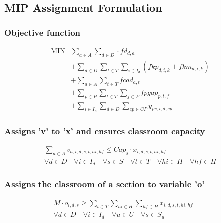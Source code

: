 
\subsection{MIP  Assignment Formulation}


\subsubsection{Objective function}
$$
\begin{array}{rl}
   \mbox{MIN} &
			\sum\limits_{a \in A}\sum\limits_{d \in D} \cdot fd_{d,a}
      \\
      &
       + \sum\limits_{d \in D} 
\sum\limits_{t \in T} \sum\limits_{i \in I_{d}} (fkp_{d,i,k} + fkm_{d,i,k})
      \\
      &
       + \sum\limits_{a \in A} \sum\limits_{t \in T} fcad_{a,t}
      \\
      &      
      + \sum\limits_{p \in P} \sum\limits_{t \in T} \sum\limits_{f \in F} fpgap_{p,t,f}
      \\
      &
      + \sum\limits_{i \in I_{d}} \sum\limits_{d \in D} \sum\limits_{cp \in CP} y_{pv,i,d,cp}
\end{array}
$$




\subsubsection{Assigns 'v' to 'x' and ensures classroom capacity}
\begin{eqnarray}
\sum\limits_{a \in A} v_{a,i,d,s,t,hi,hf}  \le Cap_{s} \cdot x_{i,d,s,t,hi,hf} \nonumber \qquad 
\\
\forall d \in D \quad
\forall i \in I_{d} \quad 
\forall s \in S \quad
\forall t \in T \quad 
\forall hi \in H \quad 
\forall hf \in H
\end{eqnarray}

\subsubsection{Assigns the classroom of a section to variable 'o'}
\begin{eqnarray}
M \cdot o_{i,d,s}  \geq \sum\limits_{t \in T}\sum\limits_{hi \in H}\sum\limits_{hf \in H} x_{i,d,s,t,hi,hf}  \nonumber \qquad 
\\
\forall d \in D \quad
\forall i \in I_{d} \quad
\forall u \in U \quad
\forall s \in S_{u} \quad
\end{eqnarray}

